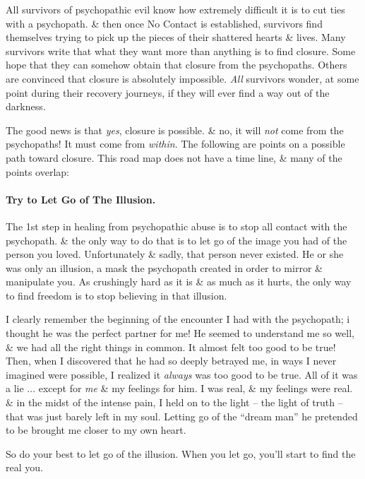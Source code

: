 \documentclass{article}
\numberwithin{equation}{section}
\begin{document}
All survivors of psychopathic evil know how extremely difficult it is to cut ties with a psychopath. \& then once No Contact is established, survivors find themselves trying to pick up the pieces of their shattered hearts \& lives. Many survivors write that what they want more than anything is to find closure. Some hope that they can somehow obtain that closure from the psychopaths. Others are convinced that closure is absolutely impossible. \textit{All} survivors wonder, at some point during their recovery journeys, if they will ever find a way out of the darkness.

The good news is that \textit{yes}, closure is possible. \& no, it will \textit{not} come from the psychopaths! It must come from \textit{within}. The following are points on a possible path toward closure. This road map does not have a time line, \& many of the points overlap:

\paragraph{Try to Let Go of The Illusion.} The 1st step in healing from psychopathic abuse is to stop all contact with the psychopath. \& the only way to do that is to let go of the image you had of the person you loved. Unfortunately \& sadly, that person never existed. He or she was only an illusion, a mask the psychopath created in order to mirror \& manipulate you. As crushingly hard as it is \& as much as it hurts, the only way to find freedom is to stop believing in that illusion.

I clearly remember the beginning of the encounter I had with the psychopath; i thought he was the perfect partner for me! He seemed to understand me so well, \& we had all the right things in common. It almost felt too good to be true! Then, when I discovered that he had so deeply betrayed me, in ways I never imagined were possible, I realized it \textit{always} was too good to be true. All of it was a lie $\ldots$ except for \textit{me} \& my feelings for him. I was real, \& my feelings were real. \& in the midst of the intense pain, I held on to the light -- the light of truth -- that was just barely left in my soul. Letting go of the ``dream man'' he pretended to be brought me closer to my own heart.

So do your best to let go of the illusion. When you let go, you'll start to find the real you.
\end{document}
